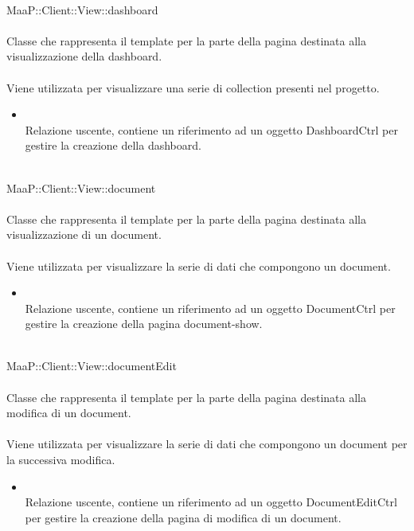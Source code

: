 \\
MaaP::Client::View::dashboard\\
\\
Classe che rappresenta il template per la parte della pagina destinata alla visualizzazione della dashboard.\\
\\
Viene utilizzata per visualizzare una serie di collection presenti nel progetto.\\
\begin{itemize}
\item{}\\
Relazione uscente, contiene un riferimento ad un oggetto DashboardCtrl per gestire la creazione della dashboard.
\end{itemize}

\\
MaaP::Client::View::document\\
\\
Classe che rappresenta il template per la parte della pagina destinata alla visualizzazione di un document.\\
\\
Viene utilizzata per visualizzare la serie di dati che compongono un document.\\
\begin{itemize}
\item{}\\
Relazione uscente, contiene un riferimento ad un oggetto DocumentCtrl per gestire la creazione della pagina document-show.
\end{itemize}

\\
MaaP::Client::View::documentEdit\\
\\
Classe che rappresenta il template per la parte della pagina destinata alla modifica di un document.\\
\\
Viene utilizzata per visualizzare la serie di dati che compongono un document per la successiva modifica.\\
\begin{itemize}
\item{}\\
Relazione uscente, contiene un riferimento ad un oggetto DocumentEditCtrl per gestire la creazione della pagina di modifica di un document.
\end{itemize}

